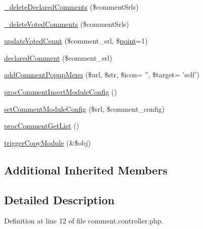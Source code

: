 \begin{DoxyCompactItemize}
\item 
\hyperlink{classcommentController_a06a2f96cd357550dd0cd834d7e61f4bf}{\-\_\-delete\-Declared\-Comments} (\$comment\-Srls)
\item 
\hyperlink{classcommentController_a0e4216451f3bb1c02aeec98bb4f54ddc}{\-\_\-delete\-Voted\-Comments} (\$comment\-Srls)
\item 
\hyperlink{classcommentController_abe720cae94b04ba356b00f80f6880e91}{update\-Voted\-Count} (\$comment\-\_\-srl, \$\hyperlink{classpoint}{point}=1)
\item 
\hyperlink{classcommentController_aaae1e5860a1e170a8fc3142f80bbcde6}{declared\-Comment} (\$comment\-\_\-srl)
\item 
\hyperlink{classcommentController_a27025d0f5cc53f58566493e6e33b924a}{add\-Comment\-Popup\-Menu} (\$url, \$str, \$icon= '', \$target= 'self')
\item 
\hyperlink{classcommentController_ab4a71283244210be754cceb8511e8789}{proc\-Comment\-Insert\-Module\-Config} ()
\item 
\hyperlink{classcommentController_a3e4d45ad61f74541e1182c29924b625d}{set\-Comment\-Module\-Config} (\$srl, \$comment\-\_\-config)
\item 
\hyperlink{classcommentController_ac9edb9826c8b07ceb1a4db29c5db514a}{proc\-Comment\-Get\-List} ()
\item 
\hyperlink{classcommentController_a5cf1c177c5cbdd0556363a0204d92f5f}{trigger\-Copy\-Module} (\&\$obj)
\end{DoxyCompactItemize}
\subsection*{Additional Inherited Members}


\subsection{Detailed Description}


Definition at line 12 of file comment.\-controller.\-php.



